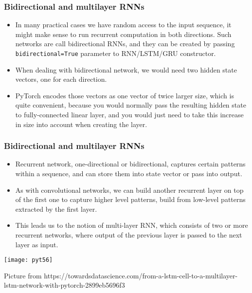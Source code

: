 \begin{frame}[fragile] \frametitle{Bidirectional and multilayer RNNs}

\begin{itemize}
\item In many practical cases we have random access to the input sequence, it might make sense to run recurrent computation in both directions. Such networks are call bidirectional RNNs, and they can be created by passing \lstinline|bidirectional=True| parameter to RNN/LSTM/GRU constructor.
\item When dealing with bidirectional network, we would need two hidden state vectors, one for each direction. 
\item PyTorch encodes those vectors as one vector of twice larger size, which is quite convenient, because you would normally pass the resulting hidden state to fully-connected linear layer, and you would just need to take this increase in size into account when creating the layer.
\end{itemize}
\end{frame}

\begin{frame}[fragile] \frametitle{Bidirectional and multilayer RNNs}

\begin{itemize}
\item Recurrent network, one-directional or bidirectional, captures certain patterns within a sequence, and can store them into state vector or pass into output. 
\item As with convolutional networks, we can build another recurrent layer on top of the first one to capture higher level patterns, build from low-level patterns extracted by the first layer. 
\item This leads us to the notion of multi-layer RNN, which consists of two or more recurrent networks, where output of the previous layer is passed to the next layer as input.
\end{itemize}

\begin{center}
\texttt{[image: pyt56]}
\end{center}

{\tiny Picture from https://towardsdatascience.com/from-a-lstm-cell-to-a-multilayer-lstm-network-with-pytorch-2899eb5696f3}

\end{frame}

